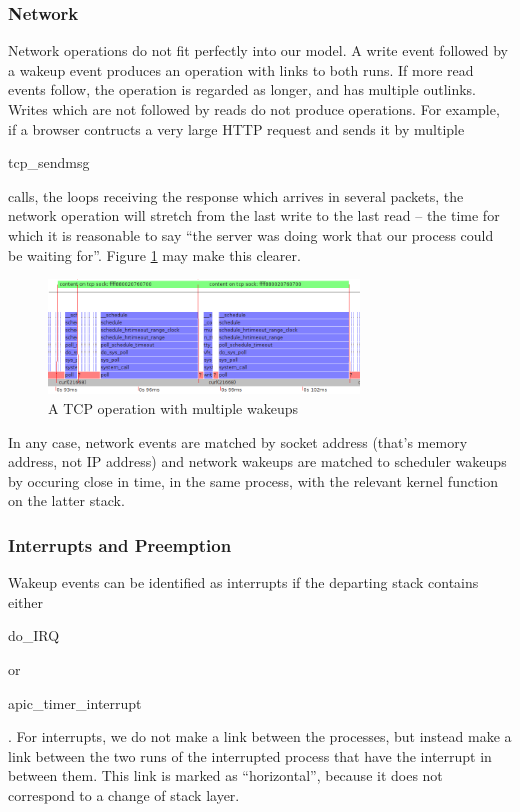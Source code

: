 \documentclass[10pt]{article}
\begin{document}
\subsubsection{Network}

Network operations do not fit perfectly into our model.  A write event followed by a wakeup event produces an operation with links to both runs.  If more read events follow, the operation is regarded as longer, and has multiple outlinks.  Writes which are not followed by reads do not produce operations.  For example, if a browser contructs a very large HTTP request and sends it by multiple \begin{tt}tcp\_sendmsg\end{tt} calls, the loops receiving the response which arrives in several packets, the network operation will stretch from the last write to the last read -- the time for which it is reasonable to say ``the server was doing work that our process could be waiting for''.  Figure \ref{fig:tcp} may make this clearer. 

\begin{figure}[h]
\includegraphics[width=3.25in]{tcpexample}
\caption{A TCP operation with multiple wakeups}
\label{fig:tcp}
\end{figure}

In any case, network events are matched by socket address (that's memory address, not IP address) and network wakeups are matched to scheduler wakeups by occuring close in time, in the same process, with the relevant kernel function on the latter stack.

\subsubsection{Interrupts and Preemption}

Wakeup events can be identified as interrupts if the departing stack contains either \begin{tt}do\_IRQ\end{tt} or\\ \begin{tt}apic\_timer\_interrupt\end{tt}.  For interrupts, we do not make a link between the processes, but instead make a link between the two runs of the interrupted process that have the interrupt in between them.  This link is marked as ``horizontal'', because it does not correspond to a change of stack layer.
\end{document}
